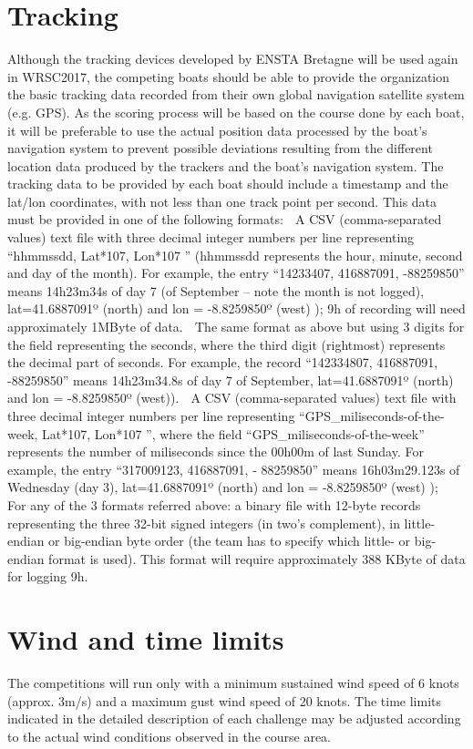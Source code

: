 \documentclass[12pt]{article}
\begin{document}
\section{Tracking}
Although the tracking devices developed by ENSTA Bretagne will be used again in
WRSC2017,
the competing boats should be able to provide the organization the basic
tracking data recorded
from their own global navigation satellite system (e.g. GPS). As the scoring
process will be
based on the course done by each boat, it will be preferable to use the actual
position data
processed by the boat’s navigation system to prevent possible deviations
resulting from the
different location data produced by the trackers and the boat’s navigation
system.
The tracking data to be provided by each boat should include a timestamp and the
lat/lon
coordinates, with not less than one track point per second. This data must be
provided in one
of the following formats:
 A CSV (comma-separated values) text file with three decimal integer numbers
per line
representing “hhmmssdd, Lat*107, Lon*107
” (hhmmssdd represents the hour,
minute, second and day of the month). For example, the entry “14233407,
416887091, -88259850” means 14h23m34s of day 7 (of September – note the month
is not logged), lat=41.6887091º (north) and lon = -8.8259850º (west) ); 9h of
recording
will need approximately 1MByte of data.
 The same format as above but using 3 digits for the field representing the
seconds,
where the third digit (rightmost) represents the decimal part of seconds. For
example,
the record “142334807, 416887091, -88259850” means 14h23m34.8s of day 7
of September, lat=41.6887091º (north) and lon = -8.8259850º (west)).
 A CSV (comma-separated values) text file with three decimal integer numbers
per line
representing “GPS\_miliseconds-of-the-week, Lat*107, Lon*107
”, where the
field “GPS\_miliseconds-of-the-week” represents the number of miliseconds since
the 00h00m of last Sunday. For example, the entry “317009123, 416887091, -
88259850” means 16h03m29.123s of Wednesday (day 3), lat=41.6887091º (north) and
lon = -8.8259850º (west) );
 For any of the 3 formats referred above: a binary file with 12-byte records
representing
the three 32-bit signed integers (in two’s complement), in little-endian or
big-endian
byte order (the team has to specify which little- or big-endian format is used).
This
format will require approximately 388 KByte of data for logging 9h.

\section{Wind and time limits}
The competitions will run only with a minimum sustained wind speed of 6 knots
(approx. 3m/s)
and a maximum gust wind speed of 20 knots. The time limits indicated in the
detailed
description of each challenge may be adjusted according to the actual wind
conditions observed
in the course area.
\end{document}
